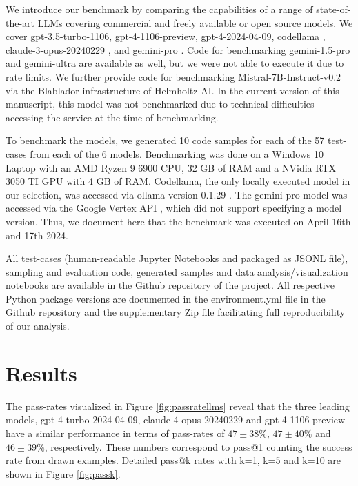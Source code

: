 \documentclass{ecai}
\begin{document}
We introduce our benchmark by comparing the capabilities of a range of state-of-the-art LLMs covering commercial and freely available or open source models. We cover gpt-3.5-turbo-1106, gpt-4-1106-preview, gpt-4-2024-04-09, codellama \citep{roziere2024code}, claude-3-opus-20240229 \citep{anthropic2024claude}, and gemini-pro \citep{geminiteam2024gemini}. Code for benchmarking gemini-1.5-pro and gemini-ultra are available as well, but we were not able to execute it due to rate limits. We further provide code for benchmarking Mistral-7B-Instruct-v0.2 \citep{jiang2023mistral} via the Blablador infrastructure of Helmholtz AI. In the current version of this manuscript, this model was not benchmarked due to technical difficulties accessing the service at the time of benchmarking.

To benchmark the models, we generated 10 code samples for each of the 57 test-cases from each of the 6 models. Benchmarking was done on a Windows 10 Laptop with an AMD Ryzen 9 6900 CPU, 32 GB of RAM and a NVidia RTX 3050 TI GPU with 4 GB of RAM. Codellama, the only locally executed model in our selection, was accessed via ollama version 0.1.29 \citep{ollama2024windows}. The gemini-pro model was accessed via the Google Vertex API \citep{google2024vertex}, which did not support specifying a model version. Thus, we document here that the benchmark was executed on April 16th and 17th 2024. 

All test-cases (human-readable Jupyter Notebooks and packaged as JSONL file), sampling and evaluation code, generated samples and data analysis/visualization notebooks are available in the Github repository of the project. All respective Python package versions are documented in the environment.yml file in the Github repository and the supplementary Zip file facilitating full reproducibility of our analysis.





\section{Results}

The pass-rates visualized in Figure \ref{fig:passratellms} reveal that the three leading models, gpt-4-turbo-2024-04-09, claude-4-opus-20240229 and gpt-4-1106-preview have a similar performance in terms of pass-rates of $47\pm38\%$, $47\pm40\%$ and $46\pm39\%$, respectively. These numbers correspond to pass@1 counting the success rate from drawn examples. Detailed pass@k rates with k=1, k=5 and k=10 are shown in Figure \ref{fig:passk}.
\end{document}
